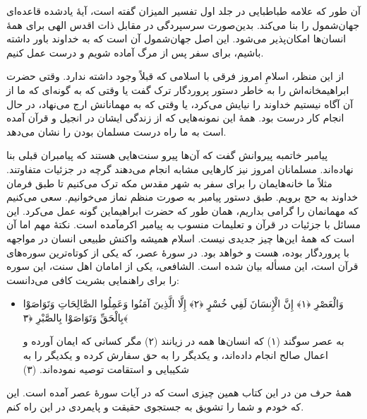 آن طور که علامه طباطبایی در جلد اول تفسیر المیزان گفته است، آیهٔ یادشده قاعده‌ای جهان‌شمول را بنا می‌کند. بدین‌صورت  سرسپردگی در مقابل ذات اقدس الهی برای همهٔ انسان‌ها امکان‌پذیر می‌شود. این اصل جهان‌شمول آن است که به خداوند باور داشته باشیم، برای سفر پس از مرگ آماده شویم و درست عمل کنیم.

از این منظر، اسلامِ امروز فرقی با اسلامی که قبلاً وجود داشته ندارد. وقتی حضرت ابراهیم{}خانه‌اش را به خاطر دستور پروردگار ترک گفت یا وقتی که به گونه‌ای که ما از آن آگاه نیستیم خداوند را  نیایش می‌کرد، یا وقتی که به مهمانانش ارج می‌نهاد، در حال انجام کار درست بود. همهٔ این نمونه‌هایی که از زندگی ایشان در انجیل و قرآن آمده است به ما راه درست مسلمان بودن را نشان می‌دهد.

پیامبر خاتم{}به پیروانش گفت که آن‌ها پیرو سنت‌هایی هستند که پیامبران قبلی بنا نهاده‌اند. مسلمانان امروز نیز کارهایی مشابه انجام می‌دهند گرچه در جزئیات متفاوتند. مثلاً ما خانه‌هایمان را برای سفر به شهر مقدس مکه ترک می‌کنیم تا طبق فرمان خداوند به حج برویم. طبق دستور پیامبر{} به صورت منظم نماز می‌خوانیم.  سعی می‌کنیم که مهمانمان را گرامی بداریم، همان طور که حضرت ابراهیم{}این گونه عمل می‌کرد. این مسائل با جزئیات در قرآن و تعلیمات منسوب به پیامبر اکرم{}آمده است. نکتهٔ مهم اما آن است که همهٔ این‌ها چیز جدیدی نیست. اسلام همیشه واکنش طبیعی انسان در مواجهه با پروردگار بوده، هست و خواهد بود. در سوره‌ٔ عصر، که یکی از کوتاه‌ترین سوره‌های قرآن است، این مسأله بیان شده است. الشافعی، یکی از امامان  اهل سنت، این سوره را برای راهنمایی بشریت کافی می‌دانست:

\begin{itemize}
	\item[]
	{
		
		وَالْعَصْرِ ﴿١﴾ إِنَّ الْإِنسَانَ لَفِي خُسْرٍ ﴿٢﴾ إِلَّا الَّذِينَ آمَنُوا وَعَمِلُوا الصَّالِحَاتِ وَتَوَاصَوْا بِالْحَقِّ وَتَوَاصَوْا بِالصَّبْرِ ﴿٣﴾}
	
	{
		به عصر سوگند (۱) که انسان‌ها همه در زیانند (۲) مگر کسانی که ایمان آورده و اعمال صالح انجام داده‌اند، و یکدیگر را به حق سفارش کرده و یکدیگر را به شکیبایی و استقامت توصیه نموده‌اند. (۳)}
\end{itemize}

همهٔ حرف من در این کتاب همین چیزی است که در آیات سورهٔ عصر آمده است. این که خودم و شما را تشویق به جستجوی حقیقت و پایمردی در این راه کنم.  

